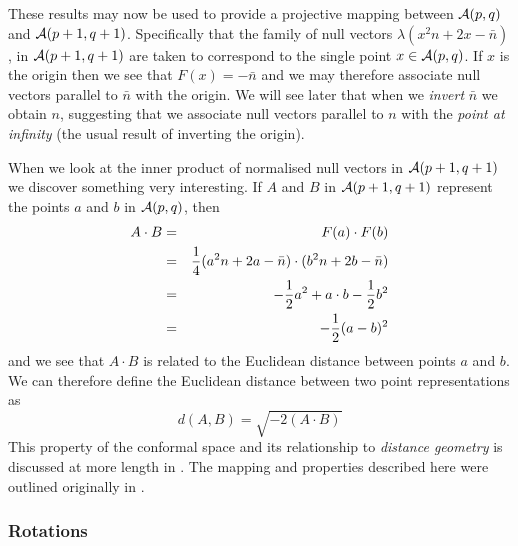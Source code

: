 These results may now be used to provide a projective mapping
between ${\mathcal{A}}(p,q)$ and  ${\mathcal{A}}(p+1,q+1)$. Specifically that the
family of null vectors $\lambda(x^2n + 2x - \bar{n})$,
in ${\mathcal{A}}(p+1,q+1)$ are taken to correspond to the
single point $x\in {\mathcal{A}}(p,q)$. If $x$ is the origin
then we see that $F(x) = -\bar{n}$ and we may therefore associate
null vectors parallel to $\bar{n}$ with the origin. 
We will see later that when we \emph{invert} $\bar{n}$ 
we obtain $n$, suggesting
that we associate null vectors parallel to $n$ with the 
\emph{point at infinity} (the usual result of inverting the origin).

When we look at the inner product of normalised null vectors in
${\mathcal{A}}(p+1,q+1)$ we discover something very
interesting. If $A$ and $B$ in ${\mathcal{A}}(p+1,q+1)$
represent the points $a$ and $b$ in ${\mathcal{A}}(p,q)$, then
%
\begin{eqnarray} A\cdot B &  =  &  F(a)\cdot F(b) \nonumber \\
            &  =  &  \frac{1}{4}(a^2n + 2a - \bar{n})\cdot (b^2n + 2b -
            \bar{n})\nonumber \\
            & = &    -\frac{1}{2}a^2 + a\cdot b - \frac{1}{2}b^2 \nonumber \\
            &  =  &  -\frac{1}{2}(a-b)^2
\end{eqnarray}
%
and we see that $A\cdot B$ is related to the Euclidean
distance between points $a$ and $b$. 
We can therefore define the Euclidean distance between two
point representations as
\begin{equation}
d(A,B) = \sqrt{-2 (A \cdot B) }
            \label{distance}
\end{equation}
This property of the
conformal space and its relationship to \emph{distance geometry}
\cite{distgeom} is discussed at more length in \cite{oldwine}. 
The mapping and properties described here were outlined
originally in \cite{HS84}.

\subsubsection{Rotations}

